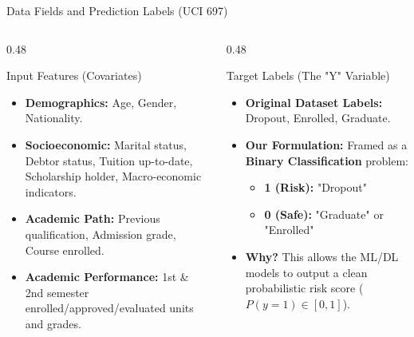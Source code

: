 \documentclass[aspectratio=169, 10pt]{beamer}
\begin{document}
\begin{frame}{Data Fields and Prediction Labels (UCI 697)}
  \begin{columns}[T]
    \begin{column}{0.48\textwidth}
      \begin{block}{Input Features (Covariates)}
        \begin{itemize}
          \item \textbf{Demographics:} Age, Gender, Nationality.
          \item \textbf{Socioeconomic:} Marital status, Debtor status, Tuition up-to-date, Scholarship holder, Macro-economic indicators.
          \item \textbf{Academic Path:} Previous qualification, Admission grade, Course enrolled.
          \item \textbf{Academic Performance:} 1st \& 2nd semester enrolled/approved/evaluated units and grades.
        \end{itemize}
      \end{block}
    \end{column}
    \hfill
    \begin{column}{0.48\textwidth}
      \begin{block}{Target Labels (The "Y" Variable)}
        \begin{itemize}
          \item \textbf{Original Dataset Labels:} Dropout, Enrolled, Graduate.
          \item \textbf{Our Formulation:} Framed as a \textbf{Binary Classification} problem:
            \begin{itemize}
              \item \textbf{1 (Risk):} "Dropout"
              \item \textbf{0 (Safe):} "Graduate" or "Enrolled"
            \end{itemize}
          \item \textbf{Why?} This allows the ML/DL models to output a clean probabilistic risk score ($P(y=1) \in [0,1]$).
        \end{itemize}
      \end{block}
    \end{column}
  \end{columns}
\end{frame}
\end{document}
